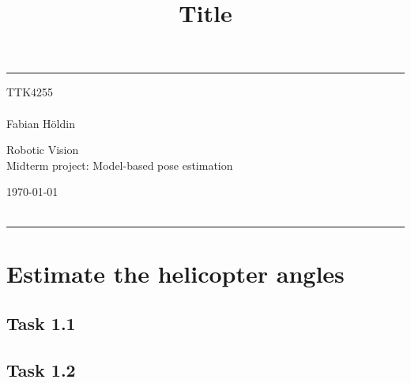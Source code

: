 \documentclass[a4paper]{article} %
\begin{document}

    \title{Title} %
    \fancyhead[C]{}
    \hrule \medskip %
    \begin{minipage}{0.295\textwidth} %
        \raggedright
        TTK4255\\ %
        \footnotesize %
        \hfill\\
        Fabian Höldin %
    \end{minipage}
    \begin{minipage}{0.4\textwidth} %
        \centering
        \large %
        Robotic Vision \\ %
        \normalsize %
        Midterm project: Model-based pose estimation\\ %
    \end{minipage}
    \begin{minipage}{0.295\textwidth} %
        \raggedleft
        \today\\ %
        \footnotesize %
        \hfill\\
    \end{minipage}
    \medskip\hrule %

\section{Estimate the helicopter angles}
    \subsection*{Task 1.1}
    \subsection*{Task 1.2}
\end{document}
